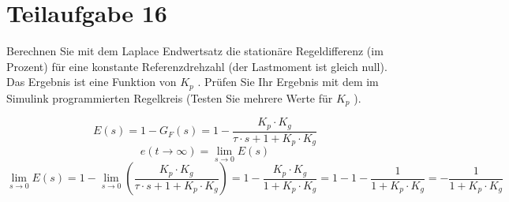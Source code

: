 \section{Teilaufgabe 16}
\begin{aufgabe}
Berechnen Sie mit dem Laplace Endwertsatz die stationäre Regeldifferenz (im 
Prozent) für eine konstante Referenzdrehzahl (der Lastmoment ist gleich null). 
Das Ergebnis ist eine Funktion von $K_p$ . Prüfen Sie Ihr Ergebnis mit dem im 
Simulink programmierten Regelkreis (Testen Sie mehrere Werte für $K_p$ ).
\end{aufgabe}
\[ E(s) = 1 - G_F(s) 
    = 1 - \frac{K_p \cdot K_g}{\tau \cdot s + 1 + K_p \cdot K_g}
\]
\[ e(t \to \infty) = \lim\limits_{s \to 0} E(s) \]
\[ \lim\limits_{s \to 0} E(s)
    = 1 - \lim\limits_{s \to 0}
        \left(\frac{K_p \cdot K_g}{\tau \cdot s + 1 + K_p \cdot K_g}\right)
    = 1 - \frac{K_p \cdot K_g}{1 + K_p \cdot K_g}
    = 1 - 1 - \frac{1}{1 + K_p \cdot K_g}
    = -\frac{1}{1 + K_p \cdot K_g}
\]
